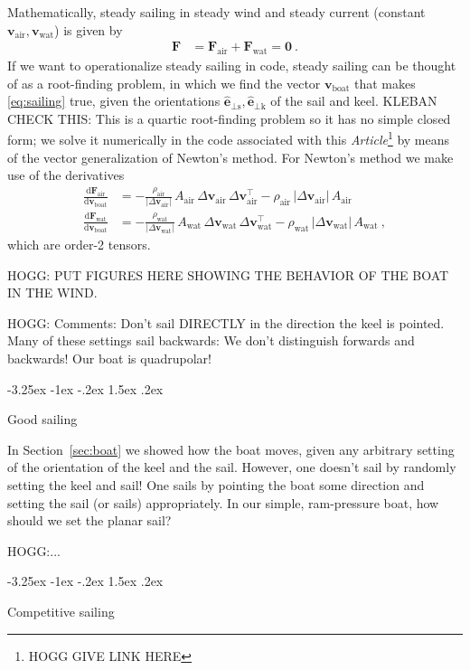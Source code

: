 \documentclass{article}
\makeatletter
\newcommand{\dd}{\mathrm{d}}
\renewcommand{\vec}[1]{\boldsymbol{#1}}
\newcommand{\uvec}{\vec{\hat{e}}}
\newcommand{\air}{\text{air}}
\newcommand{\water}{\text{wat}}
\newcommand{\boat}{\text{boat}}
\newcommand{\sail}{\text{s}}
\newcommand{\keel}{\text{k}}
\newcommand{\vair}{\vec{v}_\air}
\newcommand{\vwater}{\vec{v}_\water}
\newcommand{\vboat}{\vec{v}_\boat}
\newcommand{\documentname}{\textsl{Article}}
\newcommand{\secref}[1]{Section~\ref{#1}}
\renewcommand\section{\@startsection {section}{1}{\z@}%
  {-3.25ex \@plus -1ex \@minus -.2ex}%
  {1.5ex \@plus .2ex}%
  {\raggedright\normalfont\large\bfseries}}
\makeatother
\begin{document}
Mathematically, steady sailing in steady wind and steady current (constant $\vair, \vwater$) is given by
\begin{align}\label{eq:sailing}
    \vec{F} &= \vec{F}_\air + \vec{F}_\water = \vec{0} ~.
\end{align}
If we want to operationalize steady sailing in code, steady sailing can be thought of as a root-finding problem, in which we find the vector $\vboat$ that makes \eqref{eq:sailing} true, given the orientations $\uvec_{\perp\sail}, \uvec_{\perp\keel}$ of the sail and keel. KLEBAN CHECK THIS: This is a quartic root-finding problem so it has no simple closed form; we solve it numerically in the code associated with this \documentname\footnote{HOGG GIVE LINK HERE} by means of the vector generalization of Newton's method.
For Newton's method we make use of the derivatives
\begin{align}
    \frac{\dd\vec{F}_\air}{\dd\vboat} &= -\frac{\rho_\air}{|\Delta\vair|}\,A_\air\,\Delta\vair\,\Delta\vair^\top-\rho_\air\,|\Delta\vair|\,A_\air
    \\
    \frac{\dd\vec{F}_\water}{\dd\vboat} &= -\frac{\rho_\water}{|\Delta\vwater|}\,A_\water\,\Delta\vwater\,\Delta\vwater^\top-\rho_\water\,|\Delta\vwater|\,A_\water
    ~,
\end{align}
which are order-2 tensors.

HOGG: PUT FIGURES HERE SHOWING THE BEHAVIOR OF THE BOAT IN THE WIND.

HOGG: Comments: Don't sail DIRECTLY in the direction the keel is pointed. Many of these settings sail backwards: We don't distinguish forwards and backwards! Our boat is quadrupolar!

\section{Good sailing}\label{sec:sailing}

In \secref{sec:boat} we showed how the boat moves, given any arbitrary setting of the orientation of the keel and the sail.
However, one doesn't sail by randomly setting the keel and sail!
One sails by pointing the boat some direction and setting the sail (or sails) appropriately.
In our simple, ram-pressure boat, how should we set the planar sail?

HOGG:...

\section{Competitive sailing}\label{sec:racing}
\end{document}
